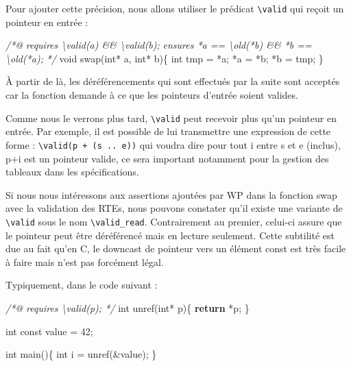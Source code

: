 \documentclass[12pt,francais,]{scrbook}
\newenvironment{Shaded}{}{}
\newcommand{\KeywordTok}[1]{\textcolor[rgb]{0.00,0.44,0.13}{\textbf{{#1}}}}
\newcommand{\DataTypeTok}[1]{\textcolor[rgb]{0.56,0.13,0.00}{{#1}}}
\newcommand{\DecValTok}[1]{\textcolor[rgb]{0.25,0.63,0.44}{{#1}}}
\newcommand{\CommentTok}[1]{\textcolor[rgb]{0.38,0.63,0.69}{\textit{{#1}}}}
\newcommand{\NormalTok}[1]{{#1}}
\begin{document}
Pour ajouter cette précision, nous allons utiliser le prédicat
\texttt{\textbackslash{}valid} qui reçoit un pointeur en entrée :

\begin{footnotesize}\begin{Shaded}
\begin{Highlighting}[]
\CommentTok{/*@}
\CommentTok{  requires \textbackslash{}valid(a) && \textbackslash{}valid(b);}
\CommentTok{  ensures  *a == \textbackslash{}old(*b) && *b == \textbackslash{}old(*a);}
\CommentTok{*/}
\DataTypeTok{void} \NormalTok{swap(}\DataTypeTok{int}\NormalTok{* a, }\DataTypeTok{int}\NormalTok{* b)\{}
  \DataTypeTok{int} \NormalTok{tmp = *a;}
  \NormalTok{*a = *b;}
  \NormalTok{*b = tmp;}
\NormalTok{\}}
\end{Highlighting}
\end{Shaded}\end{footnotesize}

À partir de là, les déréférencements qui sont effectués par la suite
sont acceptés car la fonction demande à ce que les pointeurs d'entrée
soient valides.

Comme nous le verrons plus tard, \texttt{\textbackslash{}valid} peut
recevoir plus qu'un pointeur en entrée. Par exemple, il est possible de
lui transmettre une expression de cette forme :
\texttt{\textbackslash{}valid(p\ +\ (s\ ..\ e))} qui voudra dire \og{}pour
tout i entre s et e (inclus), p+i est un pointeur valide\fg{}, ce sera
important notamment pour la gestion des tableaux dans les
spécifications.

Si nous nous intéressons aux assertions ajoutées par WP dans la fonction
swap avec la validation des RTEs, nous pouvons constater qu'il existe
une variante de \texttt{\textbackslash{}valid} sous le nom
\texttt{\textbackslash{}valid\_read}. Contrairement au premier, celui-ci
assure que le pointeur peut être déréférencé mais en lecture seulement.
Cette subtilité est due au fait qu'en C, le downcast de pointeur vers un
élément const est très facile à faire mais n'est pas forcément légal.

Typiquement, dans le code suivant :

\begin{footnotesize}\begin{Shaded}
\begin{Highlighting}[]
\CommentTok{/*@ requires \textbackslash{}valid(p); */}
\DataTypeTok{int} \NormalTok{unref(}\DataTypeTok{int}\NormalTok{* p)\{}
  \KeywordTok{return} \NormalTok{*p;}
\NormalTok{\}}

\DataTypeTok{int} \DataTypeTok{const} \NormalTok{value = }\DecValTok{42}\NormalTok{;}

\DataTypeTok{int} \NormalTok{main()\{}
  \DataTypeTok{int} \NormalTok{i = unref(&value);}
\NormalTok{\}}
\end{Highlighting}
\end{Shaded}\end{footnotesize}
\end{document}
